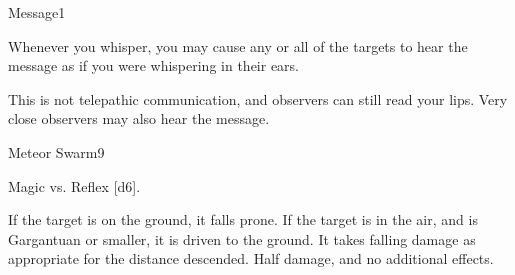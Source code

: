 \begin{spellsection}{Message}{1}
    \begin{spellheader}
    \end{spellheader}
    \begin{spellcontent}
        \begin{spelltargetinginfo}
        \end{spelltargetinginfo}
        \begin{spelleffects}
            \spelleffect Whenever you whisper, you may cause any or all of the targets to hear the message as if you were whispering in their ears.
            \spelldur \durlong
        \end{spelleffects}
    \end{spellcontent}
    \begin{spellfooter}
        \spellnotes This is not telepathic communication, and observers can still read your lips. Very close observers may also hear the message.
        \miscastexplode
    \end{spellfooter}
\end{spellsection}

\begin{spellsection}{Meteor Swarm}{9}
    \begin{spellheader}
    \end{spellheader}
    \begin{spellcontent}
        \begin{spelltargetinginfo}
            \spellrng{\rngmed}
        \end{spelltargetinginfo}
        \begin{spelleffects}
            \begin{spellattack}{Magic vs. Reflex}
                \spellsuccess {}[d6].

                If the target is on the ground, it falls prone. If the target is in the air, and is Gargantuan or smaller, it is driven to the ground. It takes falling damage as appropriate for the distance descended.
                \spellfailure Half damage, and no additional effects.
            \end{spellattack}
        \end{spelleffects}
    \end{spellcontent}
    \begin{spellfooter}
        \spellnotes \firespellnotes

        \destructivespellnotes
        \miscastyou
    \end{spellfooter}
\end{spellsection}

